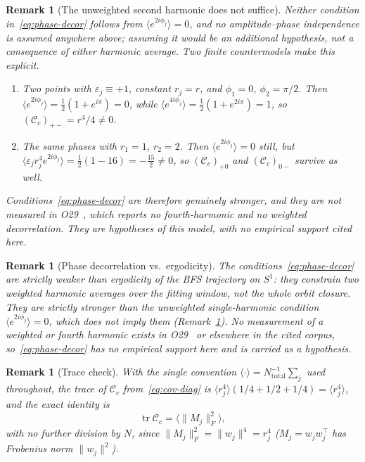 \documentclass[11pt,a4paper]{article}
\newtheorem{remark}[theorem]{Remark}
\DeclareMathOperator{\tr}{tr}
\begin{document}
  \begin{remark}[The unweighted second harmonic does not suffice]
    \label{rem:countermodels}
    Neither condition in~\eqref{eq:phase-decor} follows from
    $\langle e^{2i\phi_j}\rangle = 0$, and no amplitude--phase independence is assumed anywhere
    above; assuming it would be an additional hypothesis, not a consequence of either harmonic
    average.
    Two finite countermodels make this explicit.
    \begin{enumerate}
      \item Two points with $\varepsilon_j \equiv +1$, constant $r_j = r$, and
      $\phi_1 = 0$, $\phi_2 = \pi/2$.
      Then $\langle e^{2i\phi_j}\rangle = \tfrac12(1 + e^{i\pi}) = 0$, while
      $\langle e^{4i\phi_j}\rangle = \tfrac12(1 + e^{2i\pi}) = 1$, so
      $(\mathcal{C}_c)_{+-} = r^4/4 \neq 0$.
      \item The same phases with $r_1 = 1$, $r_2 = 2$.
      Then $\langle e^{2i\phi_j}\rangle = 0$ still, but
      $\langle \varepsilon_j r_j^4 e^{2i\phi_j}\rangle = \tfrac12(1 - 16) = -\tfrac{15}{2} \neq 0$,
      so $(\mathcal{C}_c)_{+0}$ and $(\mathcal{C}_c)_{0-}$ survive as well.
    \end{enumerate}
    Conditions~\eqref{eq:phase-decor} are therefore genuinely stronger, and they are not measured
    in O29~\cite{Beau2026a33}, which reports no fourth-harmonic and no weighted decorrelation.
    They are hypotheses of this model, with no empirical support cited here.
  \end{remark}

  \begin{remark}[Phase decorrelation vs.\ ergodicity]
    \label{rem:ergodicity}
    The conditions~\eqref{eq:phase-decor} are strictly weaker than ergodicity of the BFS
    trajectory on $S^1$: they constrain two weighted harmonic averages over the fitting window, not
    the whole orbit closure.
    They are strictly \emph{stronger} than the unweighted single-harmonic condition
    $\langle e^{2i\phi_j}\rangle = 0$, which does not imply them
    (Remark~\ref{rem:countermodels}).
    No measurement of a weighted or fourth harmonic exists in O29~\cite{Beau2026a33} or elsewhere in
    the cited corpus, so~\eqref{eq:phase-decor} has no empirical support here and is carried as a
    hypothesis.
  \end{remark}

  \begin{remark}[Trace check]
    \label{rem:trace}
    With the single convention $\langle \cdot \rangle = N_{\mathrm{total}}^{-1}\sum_j$ used
    throughout, the trace of $\mathcal{C}_c$ from~\eqref{eq:cov-diag} is
    $\langle r_j^4\rangle(1/4 + 1/2 + 1/4) = \langle r_j^4\rangle$, and the exact identity is
    \[
      \tr \mathcal{C}_c = \bigl\langle \|M_j\|_F^2 \bigr\rangle ,
    \]
    with no further division by $N$, since $\|M_j\|_F^2 = \|w_j\|^4 = r_j^4$
    ($M_j = w_j w_j^\top$ has Frobenius norm $\|w_j\|^2$).
  \end{remark}
\end{document}
